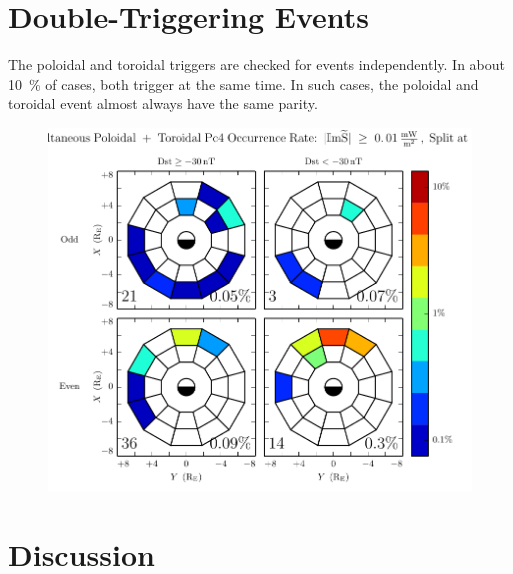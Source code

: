 \section{Double-Triggering Events}

The poloidal and toroidal triggers are checked for events independently. In about \SI{10}{\percent} of cases, both trigger at the same time. In such cases, the poloidal and toroidal event almost always have the same parity. 


\begin{figure}[!htb]
    \centering
    \includegraphics[width=\textwidth]{figures/double_rate.pdf}
    \caption[Dual Poloidal + Toroidal Pc4 Events]{
      \todo{$\cdots$}
    }
    \label{fig_double_rate}
\end{figure}


\section{Discussion}

